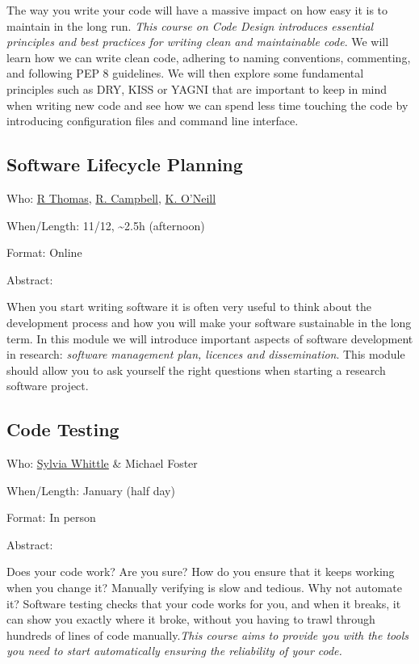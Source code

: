 \documentclass[
  letterpaper,
  DIV=11,
  numbers=noendperiod]{scrartcl}
\begin{document}
The way you write your code will have a massive impact on how easy it is
to maintain in the long run. {\emph{This course on Code Design
introduces essential principles and best practices for writing clean and
maintainable code}}. We will learn how we can write clean code, adhering
to naming conventions, commenting, and following PEP 8 guidelines. We
will then explore some fundamental principles such as DRY, KISS or YAGNI
that are important to keep in mind when writing new code and see how we
can spend less time touching the code by introducing configuration files
and command line interface.

\subsection{Software Lifecycle
Planning}\label{software-lifecycle-planning}

{Who}: \href{mailto:romain.thomas@sheffield.ac.uk}{R Thomas}, \href{}{R.
Campbell}, \href{}{K. O'Neill}

{When/Length}: 11/12, \textasciitilde2.5h (afternoon)

{Format}: Online

Abstract:

When you start writing software it is often very useful to think about
the development process and how you will make your software sustainable
in the long term. In this module we will introduce important aspects of
software development in research: {\emph{software management plan,
licences and dissemination}}. This module should allow you to ask
yourself the right questions when starting a research software project.

\subsection{Code Testing}\label{code-testing}

{Who}: \href{mailto:sylvia.whittle@sheffield.ac.uk}{Sylvia Whittle} \&
Michael Foster

{When/Length}: January (half day)

{Format}: In person

Abstract:

Does your code work? Are you sure? How do you ensure that it keeps
working when you change it? Manually verifying is slow and tedious. Why
not automate it? Software testing checks that your code works for you,
and when it breaks, it can show you exactly where it broke, without you
having to trawl through hundreds of lines of code manually.{\emph{This
course aims to provide you with the tools you need to start
automatically ensuring the reliability of your code.}}
\end{document}
